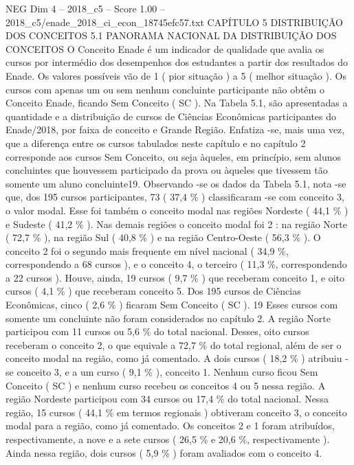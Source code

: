 \begin{textsample}{NEG Dim 4 – 2018\_c5 – Score 1.00 – 2018\_c5/enade\_2018\_ci\_econ\_18745efc57.txt}  \label{ex:f4_neg_134}
CAPÍTULO 5 DISTRIBUIÇÃO DOS CONCEITOS 5.1 PANORAMA NACIONAL DA DISTRIBUIÇÃO DOS CONCEITOS O Conceito Enade é um indicador de qualidade que avalia os cursos por intermédio dos desempenhos dos estudantes a partir dos resultados do Enade.
Os valores possíveis vão de 1 ( pior situação ) a 5 ( melhor situação ).
Os cursos com apenas um ou sem nenhum concluinte participante não obtêm o Conceito Enade, ficando Sem Conceito ( SC ).
Na Tabela 5.1, são apresentadas a quantidade e a distribuição de cursos de Ciências Econômicas participantes do Enade/2018, por faixa de conceito e Grande Região.
Enfatiza -se, mais uma vez, que a diferença entre os cursos tabulados neste capítulo e no capítulo 2 corresponde aos cursos Sem Conceito, ou seja àqueles, em princípio, sem alunos concluintes que houvessem participado da prova ou àqueles que tivessem tão somente um aluno concluinte19.
Observando -se os dados da Tabela 5.1, nota -se que, dos 195 cursos participantes, 73 ( 37,4 \% ) classificaram -se com conceito 3, o valor modal.
Esse foi também o conceito modal nas regiões Nordeste ( 44,1 \% ) e Sudeste ( 41,2 \% ).
Nas demais regiões o conceito modal foi 2 : na região Norte ( 72,7 \% ), na região Sul ( 40,8 \% ) e na região Centro-Oeste ( 56,3 \% ).
O conceito 2 foi o segundo mais frequente em nível nacional ( 34,9 \%, correspondendo a 68 cursos ), e o conceito 4, o terceiro ( 11,3 \%, correspondendo a 22 cursos ).
Houve, ainda, 19 cursos ( 9,7 \% ) que receberam conceito 1, e oito cursos ( 4,1 \% ) que receberam conceito 5.
Dos 195 cursos de Ciências Econômicas, cinco ( 2,6 \% ) ficaram Sem Conceito ( SC ). 19 Esses cursos com somente um concluinte não foram considerados no capítulo 2.
A região Norte participou com 11 cursos ou 5,6 \% do total nacional.
Desses, oito cursos receberam o conceito 2, o que equivale a 72,7 \% do total regional, além de ser o conceito modal na região, como já comentado.
A dois cursos ( 18,2 \% ) atribuiu -se conceito 3, e a um curso ( 9,1 \% ), conceito 1.
Nenhum curso ficou Sem Conceito ( SC ) e nenhum curso recebeu os conceitos 4 ou 5 nessa região.
A região Nordeste participou com 34 cursos ou 17,4 \% do total nacional.
Nessa região, 15 cursos ( 44,1 \% em termos regionais ) obtiveram conceito 3, o conceito modal para a região, como já comentado.
Os conceitos 2 e 1 foram atribuídos, respectivamente, a nove e a sete cursos ( 26,5 \% e 20,6 \%, respectivamente ).
Ainda nessa região, dois cursos ( 5,9 \% ) foram avaliados com o conceito 4.

\end{textsample}
